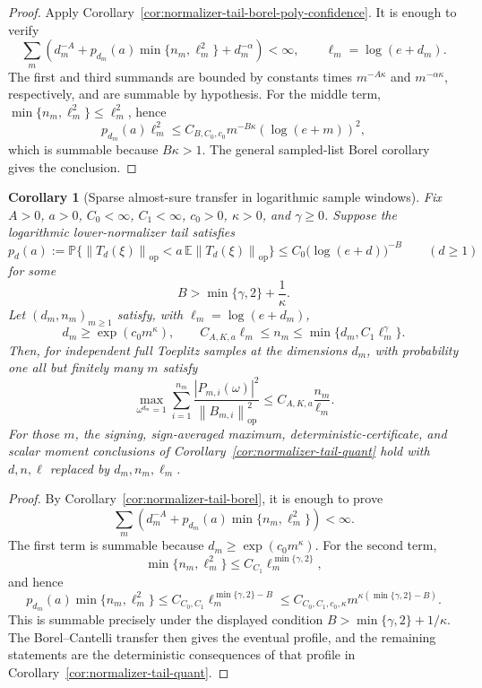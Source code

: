 \documentclass[11pt]{amsart}
\numberwithin{equation}{section}
\newtheorem{corollary}[theorem]{Corollary}
\theoremstyle{definition}
\theoremstyle{remark}
\newcommand{\op}{\mathrm{op}}
\newcommand{\Prob}{\mathbb P}
\newcommand{\Exp}{\mathbb E}
\newcommand{\norm}[1]{\left\lVert #1\right\rVert}
\newcommand{\abs}[1]{\left\lvert #1\right\rvert}
\begin{document}
\begin{proof}
Apply Corollary~\ref{cor:normalizer-tail-borel-poly-confidence}.  It is enough
to verify
\[
  \sum_m\left(d_m^{-A}
  +p_{d_m}(a)\min\{n_m,\ell_m^2\}
  +d_m^{-\alpha}\right)<\infty,
  \qquad \ell_m=\log(e+d_m).
\]
The first and third summands are bounded by constants times
\(m^{-A\kappa}\) and \(m^{-\alpha\kappa}\), respectively, and are summable by
hypothesis.  For the middle term, \(\min\{n_m,\ell_m^2\}\le\ell_m^2\), hence
\[
  p_{d_m}(a)\ell_m^2
  \le C_{B,C_0,c_0}m^{-B\kappa}(\log(e+m))^2,
\]
which is summable because \(B\kappa>1\).  The general sampled-list Borel
corollary gives the conclusion.
\end{proof}

\begin{corollary}[Sparse almost-sure transfer in logarithmic sample windows]
\label{cor:normalizer-tail-borel-window}
Fix \(A>0\), \(a>0\), \(C_0<\infty\), \(C_1<\infty\), \(c_0>0\),
\(\kappa>0\), and \(\gamma\ge0\).  Suppose the logarithmic lower-normalizer
tail satisfies
\[
  p_d(a):=\Prob\{\norm{T_d(\xi)}_{\op}<a\,\Exp\norm{T_d(\xi)}_{\op}\}
  \le C_0\bigl(\log(e+d)\bigr)^{-B}
  \qquad(d\ge1)
\]
for some
\[
  B>\min\{\gamma,2\}+\frac1\kappa .
\]
Let \((d_m,n_m)_{m\ge1}\) satisfy, with \(\ell_m=\log(e+d_m)\),
\[
  d_m\ge\exp(c_0m^\kappa),\qquad
  C_{A,K,a}\ell_m\le n_m\le \min\{d_m,C_1\ell_m^\gamma\}.
\]
Then, for independent full Toeplitz samples at the dimensions \(d_m\), with
probability one all but finitely many \(m\) satisfy
\[
  \max_{\omega^{d_m}=1}
  \sum_{i=1}^{n_m}
  \frac{\abs{P_{m,i}(\omega)}^2}{\norm{B_{m,i}}_{\op}^2}
  \le C_{A,K,a}\frac{n_m}{\ell_m}.
\]
For those \(m\), the signing, sign-averaged maximum, deterministic-certificate,
and scalar moment conclusions of Corollary~\ref{cor:normalizer-tail-quant} hold
with \(d,n,\ell\) replaced by \(d_m,n_m,\ell_m\).
\end{corollary}

\begin{proof}
By Corollary~\ref{cor:normalizer-tail-borel}, it is enough to prove
\[
  \sum_m\left(d_m^{-A}+p_{d_m}(a)\min\{n_m,\ell_m^2\}\right)<\infty .
\]
The first term is summable because \(d_m\ge\exp(c_0m^\kappa)\).  For the
second term,
\[
  \min\{n_m,\ell_m^2\}
  \le C_{C_1}\ell_m^{\min\{\gamma,2\}},
\]
and hence
\[
  p_{d_m}(a)\min\{n_m,\ell_m^2\}
  \le C_{C_0,C_1}\ell_m^{\min\{\gamma,2\}-B}
  \le C_{C_0,C_1,c_0,\kappa}
        m^{\kappa(\min\{\gamma,2\}-B)}.
\]
This is summable precisely under the displayed condition
\(B>\min\{\gamma,2\}+1/\kappa\).  The Borel--Cantelli transfer then gives the
eventual profile, and the remaining statements are the deterministic
consequences of that profile in Corollary~\ref{cor:normalizer-tail-quant}.
\end{proof}
\end{document}
